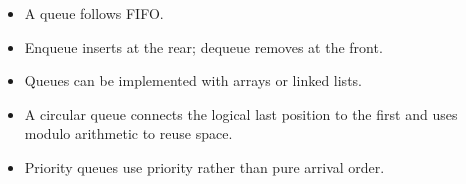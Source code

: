 \begin{chapterrecap}
\begin{itemize}
  \item A queue follows FIFO.
  \item Enqueue inserts at the rear; dequeue removes at the front.
  \item Queues can be implemented with arrays or linked lists.
  \item A circular queue connects the logical last position to the first and uses modulo arithmetic to reuse space.
  \item Priority queues use priority rather than pure arrival order.
\end{itemize}
\end{chapterrecap}


